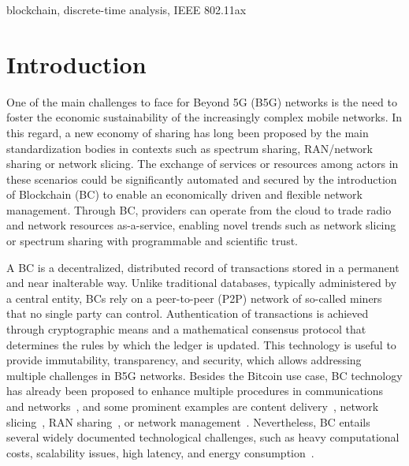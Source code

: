 \documentclass[conference]{IEEEtran}
\theoremstyle{definition}
\begin{document}
\begin{IEEEkeywords}
blockchain, discrete-time analysis, IEEE 802.11ax
\end{IEEEkeywords}



\IEEEpeerreviewmaketitle

\section{Introduction}
One of the main challenges to face for Beyond 5G (B5G) networks is the need to foster the economic sustainability of the increasingly complex mobile networks. In this regard, a new economy of sharing has long been proposed by the main standardization bodies in contexts such as spectrum sharing, RAN/network sharing or network slicing. The exchange of services or resources among actors in these scenarios could be significantly automated and secured by the introduction of Blockchain (BC) to enable an economically driven and flexible network management. Through BC, providers can operate from the cloud to trade radio and network resources as-a-service, enabling novel trends such as network slicing or spectrum sharing with programmable and scientific trust. %

A BC is a decentralized, distributed record of transactions stored in a permanent and near inalterable way. Unlike traditional databases, typically administered by a central entity, BCs rely on a peer-to-peer (P2P) network of so-called miners that no single party can control. Authentication of transactions is achieved through cryptographic means and a mathematical consensus protocol that determines the rules by which the ledger is updated. This technology is useful to provide immutability, transparency, and security, which allows addressing multiple challenges in B5G networks. Besides the Bitcoin use case, BC technology has already been proposed to enhance multiple procedures in communications and networks~\cite{nguyen2020blockchain}, and some prominent examples are content delivery~\cite{herbaut2017model}, network slicing~\cite{backman2017blockchain}, RAN sharing~\cite{ling2019blockchain}, or network management~\cite{asheralieva2019distributed, maksymyuk2020blockchain}.  Nevertheless, BC entails several widely documented technological challenges, such as heavy computational costs, scalability issues, high latency, and energy consumption~\cite{BCscalability}. 
\end{document}
